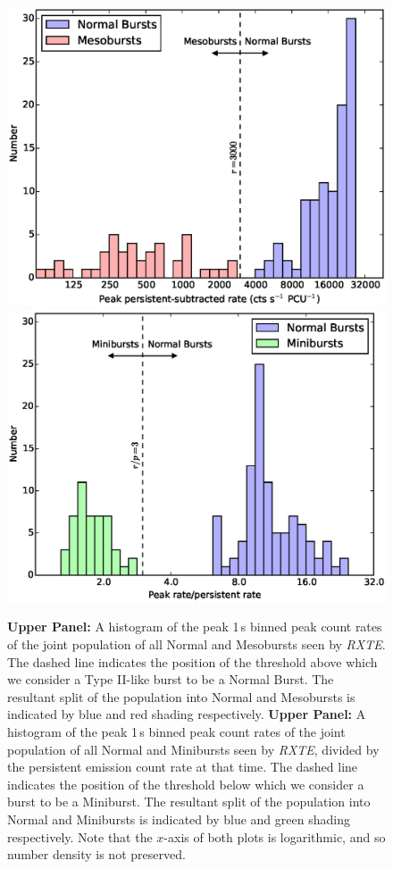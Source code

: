 \begin{figure}
  \centering
  \includegraphics[width=.9\linewidth, trim={1.3cm 0cm 2.0cm 0cm},clip]{images/norm_meso_sep.eps}
  \includegraphics[width=.9\linewidth, trim={1.3cm 0cm 2.0cm 0cm},clip]{images/norm_mini_sep.eps}
  \caption{\small \textbf{Upper Panel:} A histogram of the peak 1\,s binned peak count rates of the joint population of all Normal and Mesobursts seen by \textit{RXTE}.  The dashed line indicates the position of the threshold above which we consider a Type II-like burst to be a Normal Burst.  The resultant split of the population into Normal and Mesobursts is indicated by blue and red shading respectively.
 \textbf{Upper Panel:} A histogram of the peak 1\,s binned peak count rates of the joint population of all Normal and Minibursts seen by \textit{RXTE}, divided by the persistent emission count rate at that time.  The dashed line indicates the position of the threshold below which we consider a burst to be a Miniburst.  The resultant split of the population into Normal and Minibursts is indicated by blue and green shading respectively.
  Note that the $x$-axis of both plots is logarithmic, and so number density is not preserved.}
  \label{fig:jointhist}
\end{figure}

